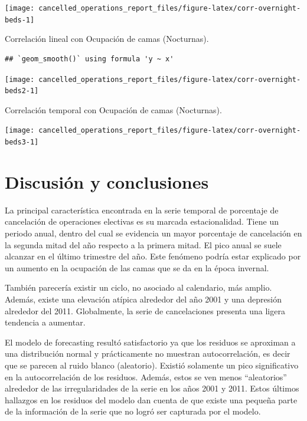 \documentclass[
]{article}
\begin{document}
\begin{center}\texttt{[image: cancelled\_operations\_report\_files/figure-latex/corr-overnight-beds-1]} \end{center}

Correlación lineal con Ocupación de camas (Nocturnas).

\begin{verbatim}
## `geom_smooth()` using formula 'y ~ x'
\end{verbatim}

\begin{center}\texttt{[image: cancelled\_operations\_report\_files/figure-latex/corr-overnight-beds2-1]} \end{center}

Correlación temporal con Ocupación de camas (Nocturnas).

\begin{center}\texttt{[image: cancelled\_operations\_report\_files/figure-latex/corr-overnight-beds3-1]} \end{center}

\hypertarget{discusiuxf3n-y-conclusiones}{%
\section{Discusión y conclusiones}\label{discusiuxf3n-y-conclusiones}}

La principal característica encontrada en la serie temporal de
porcentaje de cancelación de operaciones electivas es su marcada
estacionalidad. Tiene un periodo anual, dentro del cual se evidencia un
mayor porcentaje de cancelación en la segunda mitad del año respecto a
la primera mitad. El pico anual se suele alcanzar en el último trimestre
del año. Este fenómeno podría estar explicado por un aumento en la
ocupación de las camas que se da en la época invernal.

También parecería existir un ciclo, no asociado al calendario, más
amplio. Además, existe una elevación atípica alrededor del año 2001 y
una depresión alrededor del 2011. Globalmente, la serie de cancelaciones
presenta una ligera tendencia a aumentar.

El modelo de forecasting resultó satisfactorio ya que los residuos se
aproximan a una distribución normal y prácticamente no muestran
autocorrelación, es decir que se parecen al ruido blanco (aleatorio).
Existió solamente un pico significativo en la autocorrelación de los
residuos. Además, estos se ven menos ``aleatorios'' alrededor de las
irregularidades de la serie en los años 2001 y 2011. Estos últimos
hallazgos en los residuos del modelo dan cuenta de que existe una
pequeña parte de la información de la serie que no logró ser capturada
por el modelo.
\end{document}
